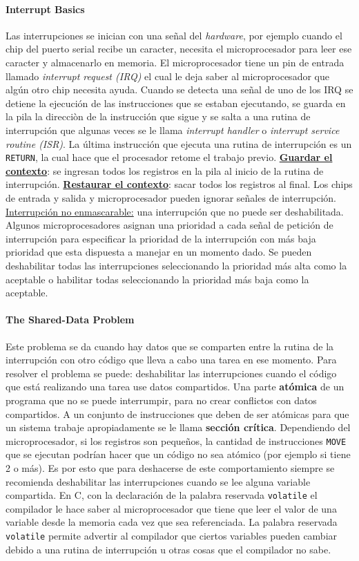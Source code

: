 \paragraph{\textnormal{\textbf{Interrupt Basics}}}
Las interrupciones se inician con una señal del \textit{hardware}, por ejemplo cuando el chip del puerto serial recibe un caracter, necesita el microprocesador para leer ese caracter y almacenarlo en memoria. El microprocesador tiene un pin de entrada llamado \textit{interrupt request (IRQ)} el cual le deja saber al microprocesador que algún otro chip necesita ayuda. Cuando se detecta una señal de uno de los IRQ se detiene la ejecución de las instrucciones que se estaban ejecutando, se guarda en la pila la direcciòn de la instrucción que sigue y se salta a una rutina de interrupción que algunas veces se le llama \textit{interrupt handler} o \textit{interrupt service routine (ISR)}. La última instrucción que ejecuta una rutina de interrupción es un \texttt{RETURN}, la cual hace que el procesador retome el trabajo previo. \underline{\textbf{Guardar el contexto}}: se ingresan todos los registros en la pila al inicio de la rutina de interrupción. \underline{\textbf{Restaurar el contexto}}: sacar todos los registros al final. Los chips de entrada y salida y microprocesador pueden ignorar señales de interrupción. \underline{Interrupción no enmascarable:} una interrupción que no puede ser deshabilitada. Algunos microprocesadores asignan una prioridad a cada señal de petición de interrupción para especificar la prioridad de la interrupción con más baja prioridad que esta dispuesta a manejar en un momento dado. Se pueden deshabilitar todas las interrupciones seleccionando la prioridad más alta como la aceptable o habilitar todas seleccionando la prioridad más baja como la aceptable. 

\paragraph{\textnormal{\textbf{The Shared-Data Problem}}}
Este problema se da cuando hay datos que se comparten entre la rutina de la interrupción con otro código que lleva a cabo una tarea en ese momento. Para resolver el problema se puede: deshabilitar las interrupciones cuando el código que está realizando una tarea use datos compartidos. Una parte \textbf{atómica} de un programa que no se puede interrumpir, para no crear conflictos con datos compartidos. A un conjunto de instrucciones que deben de ser atómicas para que un sistema trabaje apropiadamente se le llama \textbf{sección crítica}. Dependiendo del microprocesador, si los registros son pequeños, la cantidad de instrucciones \texttt{MOVE} que se ejecutan podrían hacer que un código no sea atómico (por ejemplo si tiene 2 o más). Es por esto que para deshacerse de este comportamiento siempre se recomienda deshabilitar las interrupciones cuando se lee alguna variable compartida. En C, con la declaración de la palabra reservada \texttt{volatile} el compilador le hace saber al microprocesador que tiene que leer el valor de una variable desde la memoria cada vez que sea referenciada. La palabra reservada \texttt{volatile} permite advertir al compilador que ciertos variables pueden cambiar debido a una rutina de interrupción u otras cosas que el compilador no sabe. 

